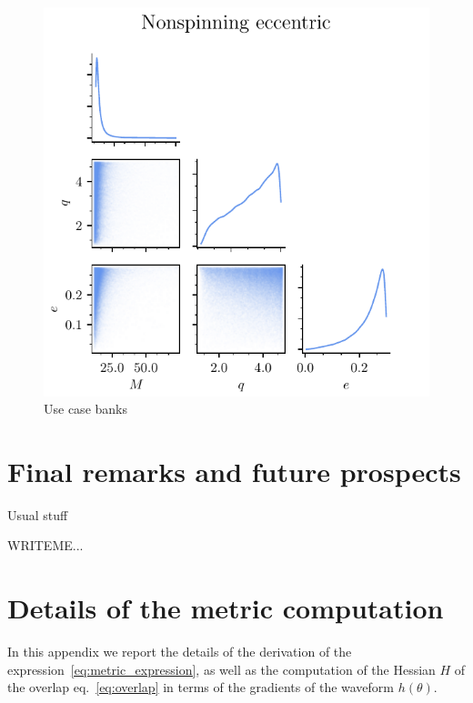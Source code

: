 \documentclass[twocolumn,showpacs,preprintnumbers,nofootinbib,prd,
superscriptaddress,10pt]{revtex4-1}
\begin{document}
\begin{figure}[t]
	\includegraphics{bank_scatter_Nonspinning_eccentric}
	\caption{Use case banks}
	\label{fig:bank_scatter}
\end{figure}

\section{Final remarks and future prospects} \label{sec:conclusion}
Usual stuff
\blindtext
\blindtext
\blindtext
\blindtext
\blindtext
\blindtext
\blindtext

        \begin{acknowledgments}
         
          WRITEME...
        \end{acknowledgments}

\appendix
\section{Details of the metric computation}\label{app:metric}

In this appendix we report the details of the derivation of the expression~\eqref{eq:metric_expression}, as well as the computation of the Hessian $H$ of the overlap eq.~\eqref{eq:overlap} in terms of the gradients of the waveform $h(\theta)$. 
\end{document}
